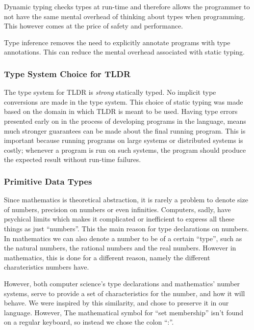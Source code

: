 Dynamic typing checks types at run-time and therefore allows the programmer to not have the same mental overhead of thinking about types when programming. This however comes at the price of safety and performance.

Type inference removes the need to explicitly annotate programs with type annotations. This can reduce the mental overhead associated with static typing.

\subsubsection{Type System Choice for TLDR}

The type system for TLDR is \emph{strong} statically typed. No implicit type conversions are made in the type system. This choice of static typing was made based on the domain in which TLDR is meant to be used. Having type errors presented early on in the process of developing programs in the language, means much stronger guarantees can be made about the final running program. This is important because running programs on large systems or distributed systems is costly; whenever a program is run on such systems, the program should produce the expected result without run-time failures.

\subsubsection{Primitive Data Types}
\label{subsec:primitives}

Since mathematics is theoretical abstraction, it is rarely a problem to denote size of numbers, precision on numbers or even infinities. Computers, sadly, have psychical limits which makes it complicated or inefficient to express all these things as just \enquote{numbers}. This the main reason for type declarations on numbers. In mathematics we can also denote a number to be of a certain \enquote{type}, such as the natural numbers, the rational numbers and the real numbers. However in mathematics, this is done for a different reason, namely the different charateristics numbers have.

However, both computer science's type declarations and mathematics' number systems, serve to provide a set of characteristics for the number, and how it will behave. We were inspired by this similarity, and chose to preserve it in our language. However, The mathematical symbol for \enquote{set membership} isn't found on a regular keyboard, so instead we chose the colon \enquote{:}.

